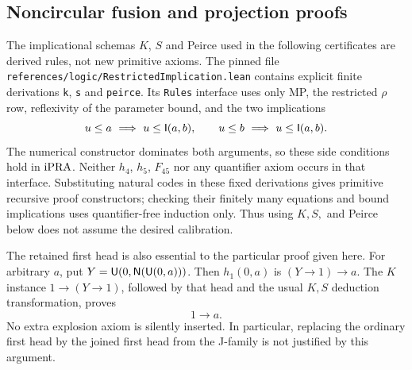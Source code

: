 \subsection{Noncircular fusion and projection proofs}

The implicational schemas $K$, $S$ and Peirce used in the following
certificates are derived rules, not new primitive axioms.  The pinned file
\texttt{references/logic/RestrictedImplication.lean} contains explicit
finite derivations \texttt{k}, \texttt{s} and \texttt{peirce}.  Its
\texttt{Rules} interface uses only MP, the restricted $\rho$ row,
reflexivity of the parameter bound, and the two implications
\[
 u\le a\ \Longrightarrow\ u\le\mathsf I(a,b),\qquad
 u\le b\ \Longrightarrow\ u\le\mathsf I(a,b).
\]
The numerical constructor dominates both arguments, so these side
conditions hold in $\mathrm{iPRA}$.  Neither $h_4$, $h_5$, $F_{45}$ nor any
quantifier axiom occurs in that interface.  Substituting natural codes
in these fixed derivations gives primitive recursive proof constructors;
checking their finitely many equations and bound implications uses
quantifier-free induction only.  Thus using $K,S,$ and Peirce below
does not assume the desired calibration.

The retained first head is also essential to the particular proof given
here.  For arbitrary $a$, put $Y=\mathsf U(0,\mathsf N(\mathsf U(0,a)))$.
Then $h_1(0,a)$ is $(Y\to1)\to a$.  The $K$ instance
$1\to(Y\to1)$, followed by that head and the usual $K,S$ deduction
transformation, proves
\[
                         1\to a.                         \tag{FW-Ex}
\]
No extra explosion axiom is silently inserted.  In particular, replacing
the ordinary first head by the joined first head from the J-family is
not justified by this argument.

